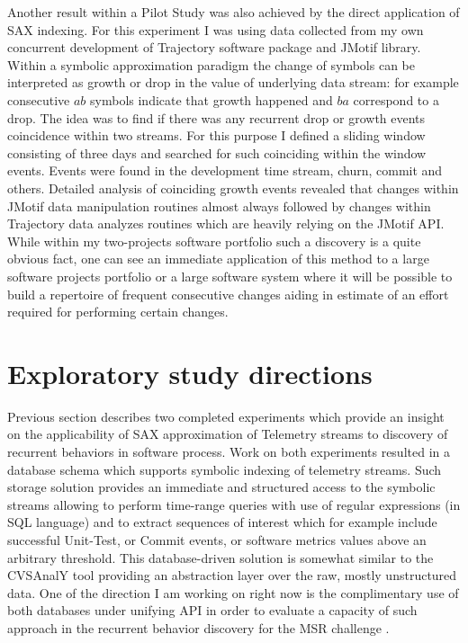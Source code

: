 \documentclass{sig-alternate}
\begin{document}
Another result within a Pilot Study was also achieved by the direct application of SAX indexing. For this experiment I was using data collected from my own concurrent development of Trajectory software package and JMotif library. Within a symbolic approximation paradigm the change of symbols can be interpreted as growth or drop in the value of underlying data stream: for example consecutive $ab$ symbols indicate that growth happened and $ba$ correspond to a drop. The idea was to find if there was any recurrent drop or growth events coincidence within two streams. For this purpose I defined a sliding window consisting of three days and searched for such coinciding within the window events. Events were found in the development time stream, churn, commit and others. Detailed analysis of coinciding growth events revealed that changes within JMotif data manipulation routines almost always followed by changes within Trajectory data analyzes routines which are heavily relying on the JMotif API. While within my two-projects software portfolio such a discovery is a quite obvious fact, one can see an immediate application of this method to a large software projects portfolio or a large software system where it will be possible to build a repertoire of frequent consecutive changes aiding in estimate of an effort required for performing certain changes.

\section{Exploratory study directions}
Previous section describes two completed experiments which provide an insight on the applicability of SAX approximation of Telemetry streams to discovery of recurrent behaviors in software process. Work on both experiments resulted in a database schema which supports symbolic indexing of telemetry streams. Such storage solution provides an immediate and structured access to the symbolic streams allowing to perform time-range queries with use of regular expressions (in SQL language) and to extract sequences of interest which for example include successful Unit-Test, or Commit events, or software metrics values above an arbitrary threshold. This database-driven solution is somewhat similar to the CVSAnalY tool \cite{citeulike:6544724} providing an abstraction layer over the raw, mostly unstructured data. One of the direction I am working on right now is the complimentary use of both databases under unifying API in order to evaluate a capacity of such approach in the recurrent behavior discovery for the MSR challenge \cite{citeulike:5043676}.
\end{document}
